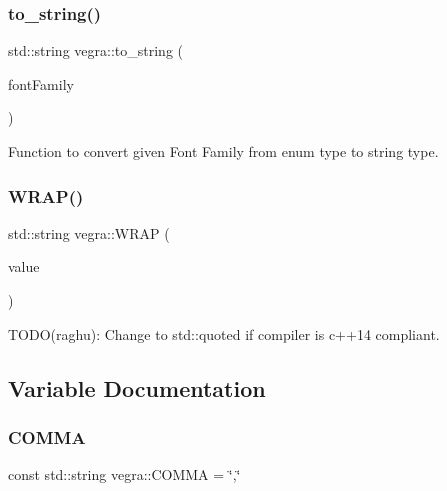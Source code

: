 \mbox{\label{namespacevegra_a776f7d3c50693931a482a34284b43ede}} 
\subsubsection{\texorpdfstring{to\+\_\+string()}{to\_string()}}
{\footnotesize\ttfamily std\+::string vegra\+::to\+\_\+string (\begin{DoxyParamCaption}\item[{const \mbox{\hyperlink{namespacevegra_a342c4e8c946c4f729d694257d1ed876b}{vegra\+::\+Font\+Family}} \&}]{font\+Family }\end{DoxyParamCaption})\hspace{0.3cm}{\ttfamily [inline]}}



Function to convert given Font Family from enum type to string type. 

\mbox{\label{namespacevegra_ad53777752123522d1807f483fa01c0a5}} 
\subsubsection{\texorpdfstring{W\+R\+A\+P()}{WRAP()}}
{\footnotesize\ttfamily std\+::string vegra\+::\+W\+R\+AP (\begin{DoxyParamCaption}\item[{std\+::string}]{value }\end{DoxyParamCaption})\hspace{0.3cm}{\ttfamily [inline]}}



T\+O\+D\+O(raghu)\+: Change to std\+::quoted if compiler is c++14 compliant. 



\subsection{Variable Documentation}
\mbox{\label{namespacevegra_aa1c954f0d9675c3c30a64de7b8bafdc2}} 
\subsubsection{\texorpdfstring{C\+O\+M\+MA}{COMMA}}
{\footnotesize\ttfamily const std\+::string vegra\+::\+C\+O\+M\+MA = \char`\"{},\char`\"{}}

